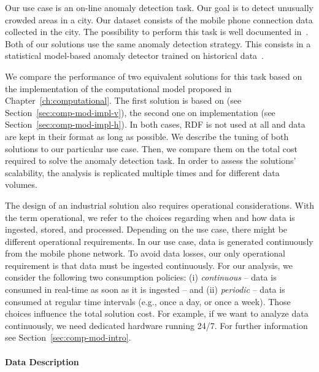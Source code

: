 {Our use case is an on-line anomaly detection task. Our goal is to detect unusually crowded areas in a city. Our dataset consists of the mobile phone connection data collected in the city. The possibility to perform this task is well documented in~\cite{krings2009urban,calabrese2010geography,calabrese2011real}. Both of our solutions use the same anomaly detection strategy. This consists in a statistical model-based anomaly detector trained on historical data~\cite{DBLP:journals/ieeemm/BalduiniVALAC15}. 

We compare the performance of two equivalent solutions for this task based on the implementation of the computational model proposed in Chapter~\ref{ch:computational}. The first solution is based on \sti{} (see Section~\ref{sec:comp-mod-impl-v}), the second one on \sparkdi{} implementation (see Section~\ref{sec:comp-mod-impl-h}).
In both cases, RDF is not used at all and data are kept in their format as long as possible.
We describe the tuning of both solutions to our particular use case. Then, we compare them on the total cost required to solve the anomaly detection task. In order to assess the solutions' scalability, the analysis is replicated multiple times and for different data volumes.

The design of an industrial solution also requires operational considerations. With the term operational, we refer to the choices regarding when and how data is ingested, stored, and processed. Depending on the use case, there might be different operational requirements. In our use case, data is generated continuously from the mobile phone network. To avoid data losses, our only operational requirement is that data must be ingested continuously. For our analysis, we consider the following two consumption policies: (i) \textit{continuous} -- data is consumed in real-time as soon as it is ingested -- and (ii) \textit{periodic} -- data is consumed at regular time intervals (e.g., once a day, or  once a week). Those choices influence the total solution cost. For example, if we want to analyze data continuously, we need dedicated hardware running 24/7. For further information see Section~\ref{sec:comp-mod-intro}.

\paragraph{Data Description}
\label{sec:desc}

}
